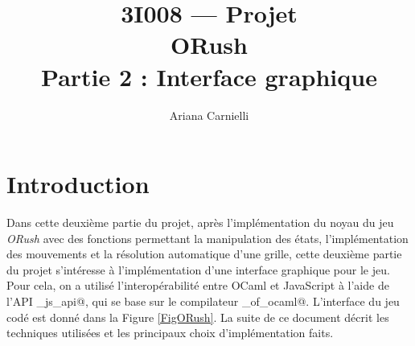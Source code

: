 \documentclass[a4paper,12pt]{article}
\begin{document}
\pagestyle{plain}

\title{3I008 --- Projet \\ ORush \\ Partie 2 : Interface graphique}
\author{Ariana Carnielli}
\date{}

\maketitle

\sloppy

\tableofcontents

\section{Introduction}

Dans cette deuxième partie du projet, après l'implémentation du noyau du jeu \emph{ORush} avec des fonctions permettant la manipulation des états, l'implémentation des mouvements et la résolution automatique d'une grille, cette deuxième partie du projet s'intéresse à l'implémentation d'une interface graphique pour le jeu. Pour cela, on a utilisé l'interopérabilité entre OCaml et JavaScript à l'aide de l'API \verb@gen_js_api@, qui se base sur le compilateur \verb@js_of_ocaml@. L'interface du jeu codé est donné dans la Figure \ref{FigORush}. La suite de ce document décrit les techniques utilisées et les principaux choix d'implémentation faits.
\end{document}
